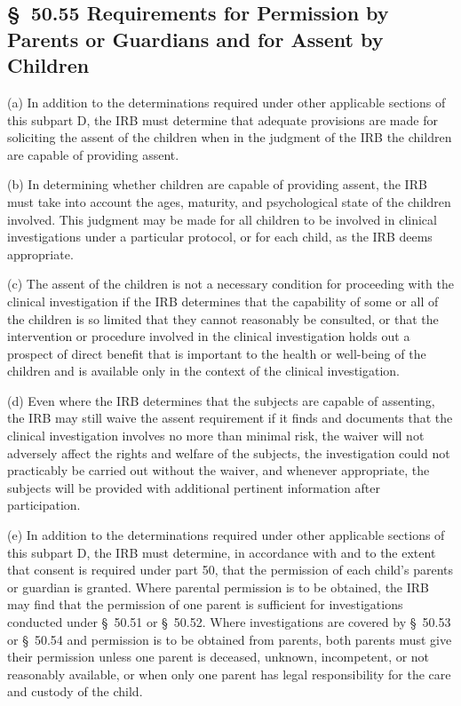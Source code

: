 \documentclass[11pt]{article}
\begin{document}
\subsection{\S~50.55 Requirements for Permission by Parents or Guardians and for Assent by Children}

(a) In addition to the determinations required under other applicable sections of this subpart D, the IRB must determine that adequate provisions are made for soliciting the assent of the children when in the judgment of the IRB the children are capable of providing assent.

(b) In determining whether children are capable of providing assent, the IRB must take into account the ages, maturity, and psychological state of the children involved. This judgment may be made for all children to be involved in clinical investigations under a particular protocol, or for each child, as the IRB deems appropriate.

(c) The assent of the children is not a necessary condition for proceeding with the clinical investigation if the IRB determines that the capability of some or all of the children is so limited that they cannot reasonably be consulted, or that the intervention or procedure involved in the clinical investigation holds out a prospect of direct benefit that is important to the health or well-being of the children and is available only in the context of the clinical investigation.

(d) Even where the IRB determines that the subjects are capable of assenting, the IRB may still waive the assent requirement if it finds and documents that the clinical investigation involves no more than minimal risk, the waiver will not adversely affect the rights and welfare of the subjects, the investigation could not practicably be carried out without the waiver, and whenever appropriate, the subjects will be provided with additional pertinent information after participation.

(e) In addition to the determinations required under other applicable sections of this subpart D, the IRB must determine, in accordance with and to the extent that consent is required under part 50, that the permission of each child's parents or guardian is granted. Where parental permission is to be obtained, the IRB may find that the permission of one parent is sufficient for investigations conducted under \S~50.51 or \S~50.52. Where investigations are covered by \S~50.53 or \S~50.54 and permission is to be obtained from parents, both parents must give their permission unless one parent is deceased, unknown, incompetent, or not reasonably available, or when only one parent has legal responsibility for the care and custody of the child.
\end{document}
